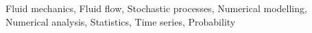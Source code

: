 \documentclass[]{article}
\begin{document}
Fluid mechanics, Fluid flow, Stochastic processes, Numerical modelling, Numerical analysis, Statistics, Time series, Probability
\end{document}
